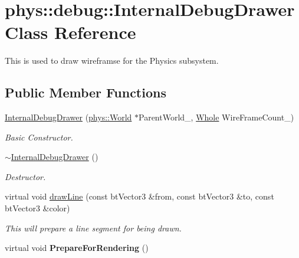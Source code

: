 \hypertarget{classphys_1_1debug_1_1InternalDebugDrawer}{
\section{phys::debug::InternalDebugDrawer Class Reference}
\label{db/d27/classphys_1_1debug_1_1InternalDebugDrawer}
}


This is used to draw wireframse for the Physics subsystem.  


\subsection*{Public Member Functions}
\begin{DoxyCompactItemize}
\item 
\hyperlink{classphys_1_1debug_1_1InternalDebugDrawer_a0e701e00e1080fdadfcf35e9051789a3}{InternalDebugDrawer} (\hyperlink{classphys_1_1World}{phys::World} $\ast$ParentWorld\_\-, \hyperlink{namespacephys_a460f6bc24c8dd347b05e0366ae34f34a}{Whole} WireFrameCount\_)
\begin{DoxyCompactList}\small\item\em Basic Constructor. \item\end{DoxyCompactList}\item 
\hyperlink{classphys_1_1debug_1_1InternalDebugDrawer_a9b5cb5ec48541effddb305de12508323}{$\sim$InternalDebugDrawer} ()
\begin{DoxyCompactList}\small\item\em Destructor. \item\end{DoxyCompactList}\item 
virtual void \hyperlink{classphys_1_1debug_1_1InternalDebugDrawer_a8a35c3c80fddaaec8e21f737ed1b3938}{drawLine} (const btVector3 \&from, const btVector3 \&to, const btVector3 \&color)
\begin{DoxyCompactList}\small\item\em This will prepare a line segment for being drawn. \item\end{DoxyCompactList}\item 
\hypertarget{classphys_1_1debug_1_1InternalDebugDrawer_a1002293d223ca20e5bccc3c3412ce262}{
virtual void {\bfseries PrepareForRendering} ()}
\label{db/d27/classphys_1_1debug_1_1InternalDebugDrawer_a1002293d223ca20e5bccc3c3412ce262}


\end{DoxyCompactItemize}
